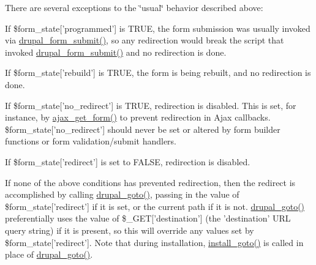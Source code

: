 There are several exceptions to the \char`\"{}usual\char`\"{} behavior described above:
\begin{DoxyItemize}
\item If \$form\_\-state\mbox{[}'programmed'\mbox{]} is TRUE, the form submission was usually invoked via \hyperlink{group__form__api_ga4312d7fe0602f6359153fc62cba1ca24}{drupal\_\-form\_\-submit()}, so any redirection would break the script that invoked \hyperlink{group__form__api_ga4312d7fe0602f6359153fc62cba1ca24}{drupal\_\-form\_\-submit()} and no redirection is done.
\item If \$form\_\-state\mbox{[}'rebuild'\mbox{]} is TRUE, the form is being rebuilt, and no redirection is done.
\item If \$form\_\-state\mbox{[}'no\_\-redirect'\mbox{]} is TRUE, redirection is disabled. This is set, for instance, by \hyperlink{group__ajax_ga9bc57ec64df41b20fd92b21fe8c1e6b0}{ajax\_\-get\_\-form()} to prevent redirection in Ajax callbacks. \$form\_\-state\mbox{[}'no\_\-redirect'\mbox{]} should never be set or altered by form builder functions or form validation/submit handlers.
\item If \$form\_\-state\mbox{[}'redirect'\mbox{]} is set to FALSE, redirection is disabled.
\item If none of the above conditions has prevented redirection, then the redirect is accomplished by calling \hyperlink{group__http__handling_ga5b68d7a934713d1d623b2b32a732235d}{drupal\_\-goto()}, passing in the value of \$form\_\-state\mbox{[}'redirect'\mbox{]} if it is set, or the current path if it is not. \hyperlink{group__http__handling_ga5b68d7a934713d1d623b2b32a732235d}{drupal\_\-goto()} preferentially uses the value of \$\_\-GET\mbox{[}'destination'\mbox{]} (the 'destination' URL query string) if it is present, so this will override any values set by \$form\_\-state\mbox{[}'redirect'\mbox{]}. Note that during installation, \hyperlink{install_8inc_a8500b736c9651e3947265d35fc6ab920}{install\_\-goto()} is called in place of \hyperlink{group__http__handling_ga5b68d7a934713d1d623b2b32a732235d}{drupal\_\-goto()}.
\end{DoxyItemize}


